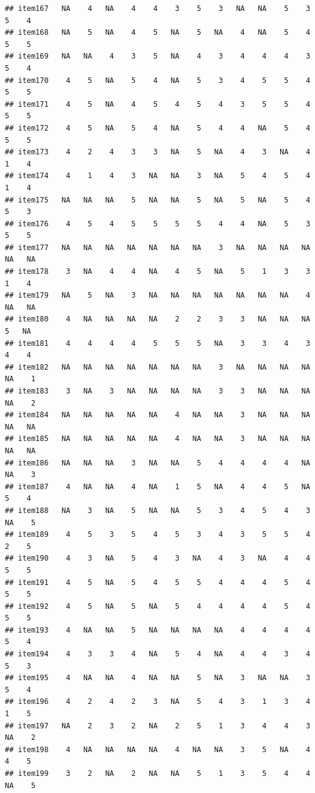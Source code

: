 \documentclass[
  man]{apa6}
\begin{document}
\begin{verbatim}
## item167   NA    4   NA    4    4    3    5    3   NA   NA    5    3    5    4
## item168   NA    5   NA    4    5   NA    5   NA    4   NA    5    4    5    5
## item169   NA   NA    4    3    5   NA    4    3    4    4    4    3    5    4
## item170    4    5   NA    5    4   NA    5    3    4    5    5    4    5    5
## item171    4    5   NA    4    5    4    5    4    3    5    5    4    5    5
## item172    4    5   NA    5    4   NA    5    4    4   NA    5    4    5    5
## item173    4    2    4    3    3   NA    5   NA    4    3   NA    4    1    4
## item174    4    1    4    3   NA   NA    3   NA    5    4    5    4    1    4
## item175   NA   NA   NA    5   NA   NA    5   NA    5   NA    5    4    5    3
## item176    4    5    4    5    5    5    5    4    4   NA    5    3    5    5
## item177   NA   NA   NA   NA   NA   NA   NA    3   NA   NA   NA   NA   NA   NA
## item178    3   NA    4    4   NA    4    5   NA    5    1    3    3    1    4
## item179   NA    5   NA    3   NA   NA   NA   NA   NA   NA   NA    4   NA   NA
## item180    4   NA   NA   NA   NA    2    2    3    3   NA   NA   NA    5   NA
## item181    4    4    4    4    5    5    5   NA    3    3    4    3    4    4
## item182   NA   NA   NA   NA   NA   NA   NA    3   NA   NA   NA   NA   NA    1
## item183    3   NA    3   NA   NA   NA   NA    3    3   NA   NA   NA   NA    2
## item184   NA   NA   NA   NA   NA    4   NA   NA    3   NA   NA   NA   NA   NA
## item185   NA   NA   NA   NA   NA    4   NA   NA    3   NA   NA   NA   NA   NA
## item186   NA   NA   NA    3   NA   NA    5    4    4    4    4   NA   NA    3
## item187    4   NA   NA    4   NA    1    5   NA    4    4    5   NA    5    4
## item188   NA    3   NA    5   NA   NA    5    3    4    5    4    3   NA    5
## item189    4    5    3    5    4    5    3    4    3    5    5    4    2    5
## item190    4    3   NA    5    4    3   NA    4    3   NA    4    4    5    5
## item191    4    5   NA    5    4    5    5    4    4    4    5    4    5    5
## item192    4    5   NA    5   NA    5    4    4    4    4    5    4    5    5
## item193    4   NA   NA    5   NA   NA   NA   NA    4    4    4    4    5    4
## item194    4    3    3    4   NA    5    4   NA    4    4    3    4    5    3
## item195    4   NA   NA    4   NA   NA    5   NA    3   NA   NA    3    5    4
## item196    4    2    4    2    3   NA    5    4    3    1    3    4    1    5
## item197   NA    2    3    2   NA    2    5    1    3    4    4    3   NA    2
## item198    4   NA   NA   NA   NA    4   NA   NA    3    5   NA    4    4    5
## item199    3    2   NA    2   NA   NA    5    1    3    5    4    4   NA    5

\end{verbatim}
\end{document}
